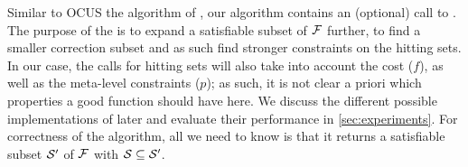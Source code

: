 Similar to OCUS the algorithm of \citet{ignatiev2015smallest}, our algorithm contains an (optional) call to \grow. 
The purpose of the \grow is to expand a satisfiable subset of $\mathcal{F}$ further, to find a smaller correction subset and as such find stronger constraints on the hitting sets. 
In our case, the calls for hitting sets will also take into account the cost ($f$), as well as the meta-level constraints ($p$); as such, it is not clear a priori which properties a good \grow function should have here.
We discuss the different possible implementations of \grow later and evaluate their performance in \cref{sec:experiments}. For correctness of the algorithm, all we need to know is that it returns a satisfiable subset $\mathcal{S}'$ of $\mathcal{F}$ with $\mathcal{S}\subseteq\mathcal{S}'$.
%

